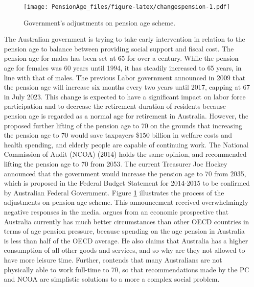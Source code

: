 \documentclass[11pt,a4paper,]{article}
\begin{document}
\begin{figure}
\centering
\texttt{[image: PensionAge\_files/figure-latex/changespension-1.pdf]}
\caption{\label{fig:changespension}Government's adjustments on pension age scheme.}
\end{figure}

The Australian government is trying to take early intervention in relation to the pension age to balance between providing social support and fiscal cost. The pension age for males has been set at 65 for over a century. While the pension age for females was 60 years until 1994, it has steadily increased to 65 years, in line with that of males. The previous Labor government announced in 2009 that the pension age will increase six months every two years until 2017, capping at 67 in July 2023. This change is expected to have a significant impact on labor force participation and to decrease the retirement duration of residents because pension age is regarded as a normal age for retirement in Australia. However, the \textcite{PC13} proposed further lifting of the pension age to 70 on the grounds that increasing the pension age to 70 would save taxpayers \$150 billion in welfare costs and health spending, and elderly people are capable of continuing work. The National Commission of Audit (NCOA) (2014) holds the same opinion, and recommended lifting the pension age to 70 from 2053. The current Treasurer Joe Hockey announced that the government would increase the pension age to 70 from 2035, which is proposed in the Federal Budget Statement for 2014-2015 to be confirmed by Australian Federal Government. Figure \ref{fig:changespension} illustrates the process of the adjustments on pension age scheme. This announcement received overwhelmingly negative responses in the media. \textcite{Guest14} argues from an economic prospective that Australia currently has much better circumstances than other OECD countries in terms of age pension pressure, because spending on the age pension in Australia is less than half of the OECD average. He also claims that Australia has a higher consumption of all other goods and services, and so why are they not allowed to have more leisure time. Further, \textcite{Power14} contends that many Australians are not physically able to work full-time to 70, so that recommendations made by the PC and NCOA are simplistic solutions to a more a complex social problem.
\end{document}

